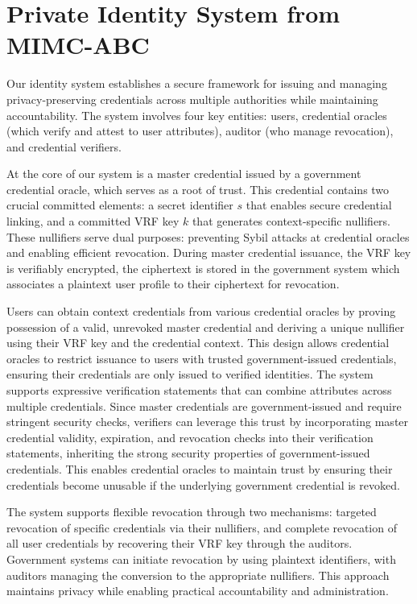 {%
% 
% 



\cleardoublepage
\section{Private Identity System from MIMC-ABC}\label{sec:idsys}

Our identity system establishes a secure framework for issuing and managing privacy-preserving credentials across multiple authorities while maintaining accountability. The system involves four key entities: users, credential oracles (which verify and attest to user attributes), auditor (who manage revocation), and credential verifiers.

\noindent At the core of our system is a master credential issued by a government credential oracle, which serves as a root of trust. This credential contains two crucial committed elements: a secret identifier $s$ that enables secure credential linking, and a committed VRF key $k$ that generates context-specific nullifiers. These nullifiers serve dual purposes: preventing Sybil attacks at credential oracles and enabling efficient revocation. During master credential issuance, the VRF key is verifiably encrypted, the ciphertext is stored in the government system which associates a plaintext user profile to their ciphertext for revocation.


\noindent Users can obtain context credentials from various credential oracles by proving possession of a valid, unrevoked master credential and deriving a unique nullifier using their VRF key and the credential context. This design allows credential oracles to restrict issuance to users with trusted government-issued credentials, ensuring their credentials are only issued to verified identities. The system supports expressive verification statements that can combine attributes across multiple credentials. Since master credentials are government-issued and require stringent security checks, verifiers can leverage this trust by incorporating master credential validity, expiration, and revocation checks into their verification statements, inheriting the strong security properties of government-issued credentials. This enables credential oracles to maintain trust by ensuring their credentials become unusable if the underlying government credential is revoked.


\noindent The system supports flexible revocation through two mechanisms: targeted revocation of specific credentials via their nullifiers, and complete revocation of all user credentials by recovering their VRF key through the auditors. Government systems can initiate revocation by using plaintext identifiers, with auditors managing the conversion to the appropriate nullifiers. This approach maintains privacy while enabling practical accountability and administration.

}

